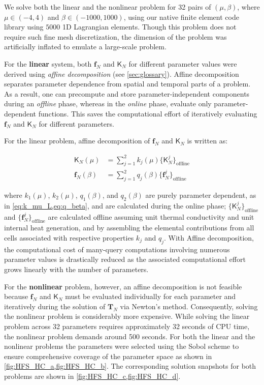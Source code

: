 \documentclass[11pt]{article}
\renewcommand{\vec}[1]{\mathbf{#1}}
\newcommand{\mat}[1]{\mathsf{#1}}
\begin{document}
We solve both the linear and the nonlinear problem for 32 pairs of $(\mu,\beta)$, where $\mu\in(-4,4)$ and $\beta\in(-1000,1000)$, using our native finite element code library using $5000$ 1D Lagrangian elements.
Though this problem does not require such fine mesh discretization, the dimension of the problem was artificially inflated to emulate a large-scale problem.


For the \textbf{linear} system, both $\vec{f}_N$ and $\mat{K}_N$ for different  parameter values were derived using \textit{affine decomposition} (see \cref{sec:glossary}).
Affine decomposition separates parameter dependence from spatial and temporal parts of a problem.
As a result, one can precompute and store parameter-independent components during an \textit{offline} phase, whereas in the \textit{online} phase, evaluate only parameter-dependent functions.
This saves the computational effort of iteratively evaluating $\vec{f}_N$ and $\mat{K}_N$ for different parameters.

For the linear problem, affine decomposition of  $\vec{f}_N$ and $\mat{K}_N$ is written as:

\begin{subequations}
\begin{align}
\mat{K}_N(\mu) &= \sum_{j=1}^2 k_j(\mu) \{\mat{K}^j_N\}_{\text{offline}} \\
\vec{f}_N(\beta) &= \sum_{j=1}^2 q_j(\beta) \{\vec{f}^j_N\}_{\text{offline}}
\end{align}
\label{eq:affine_Kb}
\end{subequations}


where $k_1(\mu)$, $k_2(\mu)$, $q_1(\beta)$, and $q_2(\beta)$ are purely parameter dependent, as in \cref{eq:k_mu_L,eq:q_beta}, and are calculated during the online phase; $\{\mat{K}^j_N\}_{\text{offline}}$ and $\{\vec{f}^j_N\}_{\text{offline}}$ are calculated offline assuming unit thermal conductivity and unit internal heat generation, and by assembling the elemental contributions from all cells associated with respective properties $k_j$ and $q_j$.
With Affine decomposition, the computational cost of many-query computations involving numerous parameter values is drastically reduced as the associated  computational effort grows linearly with the number of parameters.


For the \textbf{nonlinear} problem, however, an affine decomposition is not feasible because \(\vec{f}_N\) and \(\mat{K}_N\) must be evaluated individually for each parameter and iteratively during the solution of \(\vec{T}_N\) via Newton's method.
Consequently, solving the nonlinear problem is considerably more expensive.
While solving the linear problem across 32 parameters requires approximately 32 seconds of CPU time, the nonlinear problem demands around 500 seconds.
For both the linear and the nonlinear problems the parameters were selected using the Sobol scheme \cite{Sobol1967distribution} to ensure comprehensive coverage of the parameter space as shown in \cref{fig:HFS_HC_a,fig:HFS_HC_b}.
The corresponding solution snapshots for both problems are shown in \cref{fig:HFS_HC_c,fig:HFS_HC_d}.
\end{document}
